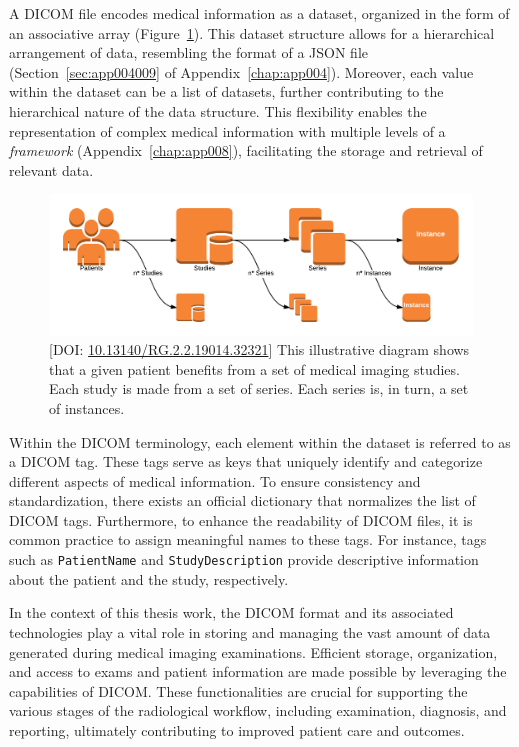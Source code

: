 A \ac{DICOM} file encodes medical information as a dataset, organized in the form of an associative array (Figure~\ref{fig:fig025}).
This dataset structure allows for a hierarchical arrangement of data, resembling the format of a \ac{JSON} file (Section~\ref{sec:app004009} of Appendix~\ref{chap:app004}).
Moreover, each value within the dataset can be a list of datasets, further contributing to the hierarchical nature of the data structure.
This flexibility enables the representation of complex medical information with multiple levels of a {\it framework} (Appendix~\ref{chap:app008}), facilitating the storage and retrieval of relevant data.

\begin{figure}[htpb]
\centering
\includegraphics[width=\textwidth]{images/fig025}
\caption{[DOI: \href{https://doi.org/10.13140/RG.2.2.19014.32321}{10.13140/RG.2.2.19014.32321}] This illustrative diagram shows that a given patient benefits from a set of medical imaging studies. Each study is made from a set of series. Each series is, in turn, a set of instances.}
\label{fig:fig025}
\end{figure}

Within the \ac{DICOM} terminology, each element within the dataset is referred to as a \ac{DICOM} tag.
These tags serve as keys that uniquely identify and categorize different aspects of medical information.
To ensure consistency and standardization, there exists an official dictionary that normalizes the list of \ac{DICOM} tags.
Furthermore, to enhance the readability of \ac{DICOM} files, it is common practice to assign meaningful names to these tags.
For instance, tags such as \texttt{PatientName} and \texttt{StudyDescription} provide descriptive information about the patient and the study, respectively.

In the context of this thesis work, the \ac{DICOM} format and its associated technologies play a vital role in storing and managing the vast amount of data generated during medical imaging examinations.
Efficient storage, organization, and access to exams and patient information are made possible by leveraging the capabilities of \ac{DICOM}.
These functionalities are crucial for supporting the various stages of the radiological workflow, including examination, diagnosis, and reporting, ultimately contributing to improved patient care and outcomes.

